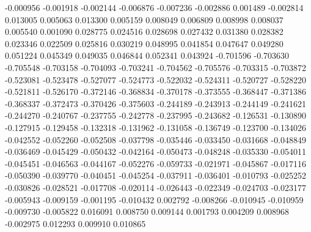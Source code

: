 -0.000956
-0.001918
-0.002144
-0.006876
-0.007236
-0.002886
0.001489
-0.002814
0.013005
0.005063
0.013300
0.005159
0.008049
0.006809
0.008998
0.008037
0.005540
0.001090
0.028775
0.024516
0.028698
0.027432
0.031380
0.028382
0.023346
0.022509
0.025816
0.030219
0.048995
0.041854
0.047647
0.049280
0.051224
0.045349
0.049035
0.046844
0.052341
0.043924
-0.701596
-0.703630
-0.705548
-0.703158
-0.704093
-0.703241
-0.704562
-0.705576
-0.703315
-0.703872
-0.523081
-0.523478
-0.527077
-0.524773
-0.522032
-0.524311
-0.520727
-0.528220
-0.521811
-0.526170
-0.372146
-0.368834
-0.370178
-0.373555
-0.368447
-0.371386
-0.368337
-0.372473
-0.370426
-0.375603
-0.244189
-0.243913
-0.244149
-0.241621
-0.244270
-0.240767
-0.237755
-0.242778
-0.237995
-0.243682
-0.126531
-0.130890
-0.127915
-0.129458
-0.132318
-0.131962
-0.131058
-0.136749
-0.123700
-0.134026
-0.042552
-0.052260
-0.052508
-0.037798
-0.035446
-0.033450
-0.031668
-0.048849
-0.036469
-0.045429
-0.050432
-0.042164
-0.050473
-0.048248
-0.035330
-0.054011
-0.045451
-0.046563
-0.044167
-0.052276
-0.059733
-0.021971
-0.045867
-0.017116
-0.050390
-0.039770
-0.040451
-0.045254
-0.037911
-0.036401
-0.010793
-0.025252
-0.030826
-0.028521
-0.017708
-0.020114
-0.026443
-0.022349
-0.024703
-0.023177
-0.005943
-0.009159
-0.001195
-0.010432
0.002792
-0.008266
-0.010945
-0.010959
-0.009730
-0.005822
0.016091
0.008750
0.009144
0.001793
0.004209
0.008968
-0.002975
0.012293
0.009910
0.010865
